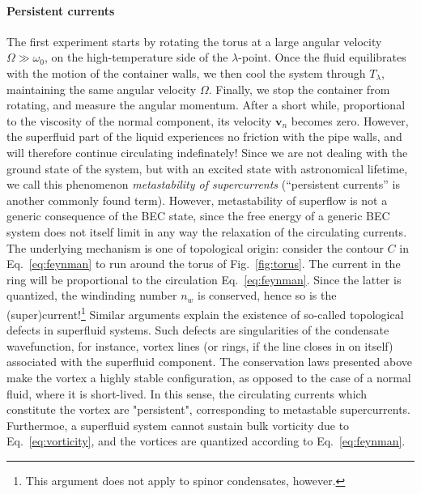 \paragraph{Persistent currents}
%
%
The first experiment starts by rotating the torus at a large angular
velocity $\Omega \gg \omega_0$, on the high-temperature side of the
$\lambda$-point. Once the fluid equilibrates with the motion of the
container walls, we then cool the system through $T_{\lambda}$,
maintaining the same angular velocity $\Omega$. Finally, we stop the
container from rotating, and measure the angular momentum.
%
%
After a short while, proportional to the viscosity of the normal
component, its velocity $\bm{v}_n$ becomes zero. However, the
superfluid part of the liquid experiences no friction with the pipe
walls, and will therefore continue circulating indefinately! Since we
are not dealing with the ground state of the system, but with an
excited state with astronomical lifetime, we call this phenomenon
\textit{metastability of supercurrents} (``persistent currents'' is
another commonly found term).
%
%
However, metastability of superflow is not a generic consequence of
the BEC state, since the free energy of a generic BEC system does not
itself limit in any way the relaxation of the circulating
currents. The underlying mechanism is one of topological origin:
consider the contour $C$ in Eq.~\eqref{eq:feynman} to run around the
torus of Fig.~\ref{fig:torus}. The current in the ring will be
proportional to the circulation Eq.~\eqref{eq:feynman}. Since the
latter is quantized, the windinding number $n_w$ is conserved, hence
so is the (super)current!\footnote{This argument does not apply to
  spinor condensates, however.} 
%
%
Similar arguments explain the existence of so-called topological
defects in superfluid systems. Such defects are singularities of the
condensate wavefunction, for instance, vortex lines (or rings, if the
line closes in on itself) associated with the superfluid
component. The conservation laws presented above make the vortex a
highly stable configuration, as opposed to the case of a normal fluid,
where it is short-lived. In this sense, the circulating currents which
constitute the vortex are "persistent", corresponding to metastable
supercurrents. Furthermoe, a superfluid system cannot sustain bulk
vorticity due to Eq.~\eqref{eq:vorticity}, and the vortices are
quantized according to Eq.~\eqref{eq:feynman}.

